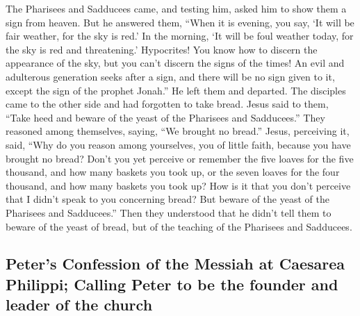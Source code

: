  The Pharisees and Sadducees came, and testing him, asked
him to show them a sign from heaven.  But he answered
them, ``When it is evening, you say, `It will be fair weather, for the
sky is red.'  In the morning, `It will be foul weather
today, for the sky is red and threatening.' Hypocrites! You know how to
discern the appearance of the sky, but you can't discern the signs of
the times!  An evil and adulterous generation seeks after
a sign, and there will be no sign given to it, except the sign of the
prophet Jonah.'' He left them and departed.  The disciples
came to the other side and had forgotten to take bread. 
Jesus said to them, ``Take heed and beware of the yeast of the Pharisees
and Sadducees.''  They reasoned among themselves, saying,
``We brought no bread.''  Jesus, perceiving it, said,
``Why do you reason among yourselves, you of little faith, because you
have brought no bread?  Don't you yet perceive or remember
the five loaves for the five thousand, and how many baskets you took up,
 or the seven loaves for the four thousand, and how many
baskets you took up?  How is it that you don't perceive
that I didn't speak to you concerning bread? But beware of the yeast of
the Pharisees and Sadducees.''  Then they understood that
he didn't tell them to beware of the yeast of bread, but of the teaching
of the Pharisees and Sadducees.

\hypertarget{peters-confession-of-the-messiah-at-caesarea-philippi-calling-peter-to-be-the-founder-and-leader-of-the-church}{%
\subsection{Peter's Confession of the Messiah at Caesarea Philippi;
Calling Peter to be the founder and leader of the
church}\label{peters-confession-of-the-messiah-at-caesarea-philippi-calling-peter-to-be-the-founder-and-leader-of-the-church}}

